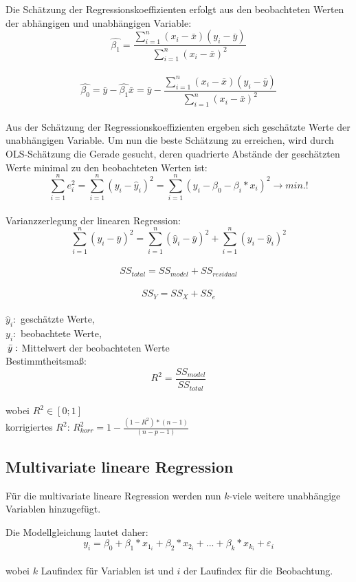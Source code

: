 \documentclass[11pt,a4paper]{article}
\begin{document}
Die Schätzung der Regressionskoeffizienten erfolgt aus den beobachteten Werten der abhängigen und unabhängigen Variable: \\
$$\hat{\beta_1} = \frac{\sum_{i=1}^n {(x_i - \bar{x})(y_i - \bar{y})}}{\sum_{i=1}^n {(x_i-\bar{x})^2}}$$ \\

$$\hat{\beta_0} = \bar{y} - \hat{\beta_1}\bar{x} = \bar{y} - \frac{\sum_{i=1}^n {(x_i - \bar{x})(y_i - \bar{y})}}{\sum_{i=1}^n {(x_i-\bar{x})^2}}$$ \\

Aus der Schätzung der Regressionskoeffizienten ergeben sich geschätzte Werte der unabhängigen Variable. Um nun die beste Schätzung zu erreichen, wird durch OLS-Schätzung die Gerade gesucht, deren quadrierte Abstände der geschätzten Werte minimal zu den beobachteten Werten ist: \\
$$\sum\limits_{i=1}^n e^2_i = \sum\limits_{i=1}^n (y_i - \hat{y}_i)^2 = \sum\limits_{i=1}^n (y_i - \beta_0 - \beta_i \ast x_i)^2 \rightarrow min.! $$ \\

Varianzzerlegung der linearen Regression:\\
$$\sum\limits_{i=1}^n (y_i - \bar{y})^2 = \sum\limits_{i=1}^n (\hat{y}_i - \bar{y})^2 + \sum\limits_{i=1}^n (y_i - \hat{y}_i)^2$$\\
$$SS_{total} = SS_{model} + SS_{residual}$$\\
$$SS_Y = SS_X + SS_e$$\\
$\hat{y}_i:$ geschätzte Werte,\\
$y_i:$ beobachtete Werte,\\
$\thinspace \bar{y}:$ Mittelwert der beobachteten Werte\\

Bestimmtheitsmaß:\\
$$ R^2 = \frac {SS_{model}} {SS_{total}}$$\\
wobei $R^2 \in [0;1]$\\
korrigiertes $R^2$: $R_{korr}^2 =1- \frac {(1-R^2) \ast (n-1)} {(n-p-1)}$ \\

\subsection{Multivariate lineare Regression}
Für die multivariate lineare Regression werden nun $k$-viele weitere unabhängige Variablen hinzugefügt. 

Die Modellgleichung lautet daher: \\
$$y_i = \beta_0 + \beta_1 \ast x_{1_i} + \beta_2 \ast x_{2_i} + ... + \beta_k \ast x_{k_i} + \varepsilon_i$$ \\
wobei $k$ Laufindex für Variablen ist und $i$ der Laufindex für die Beobachtung.\\
\end{document}
